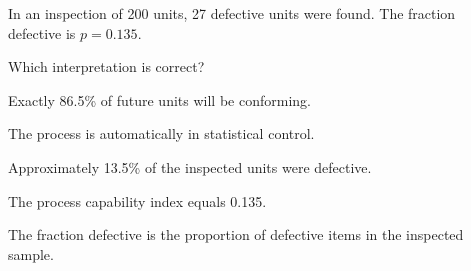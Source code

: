 
\begin{question}
In an inspection of 200 units, 27 defective units were found. The fraction defective is \(p=0.135\).

Which interpretation is correct?
\begin{answerlist}
  \item Exactly 86.5\% of future units will be conforming.
  \item The process is automatically in statistical control.
  \item Approximately 13.5\% of the inspected units were defective.
  \item The process capability index equals 0.135.
\end{answerlist}
\end{question}

\begin{solution}
The fraction defective is the proportion of defective items in the inspected sample.
\end{solution}


